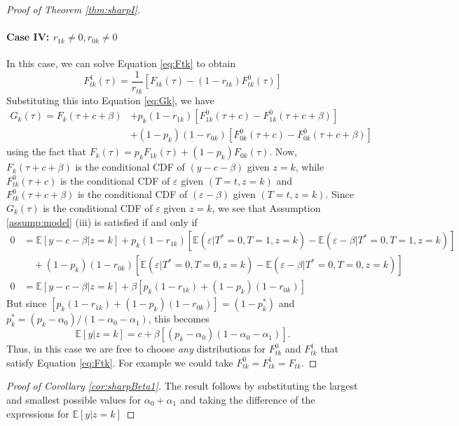 \begin{proof}[Proof of Theorem \ref{thm:sharpI}]
\paragraph{Case IV: $r_{1k}\neq 0, r_{0k} \neq 0$}
In this case, we can solve Equation \ref{eq:Ftk} to obtain
\[
  F^1_{tk}(\tau) = \frac{1}{r_{tk}}\left[F_{tk}(\tau) - (1 - r_{tk})F^0_{tk}(\tau)\right]
\]
Substituting this into Equation \ref{eq:Gk}, we have
\begin{align*}
  G_k(\tau) = F_k(\tau + c + \beta) &+ p_k(1 - r_{1k})\left[F^0_{1k}(\tau + c) - F_{1k}^0(\tau + c + \beta)\right]\\
  &+ (1 - p_k)(1 - r_{0k}) \left[ F^0_{0k}(\tau + c) - F^0_{0k}(\tau + c + \beta) \right]
\end{align*}
using the fact that $F_k(\tau) = p_k F_{1k}(\tau) + (1 - p_k) F_{0k}(\tau)$.
Now, $F_k(\tau + c + \beta)$ is the conditional CDF of $(y - c - \beta)$ given $z=k$, while $F_{tk}^0(\tau + c)$ is the conditional CDF of $\varepsilon$ given $(T = t,z =k)$ and $F^0_{tk}(\tau + c + \beta)$ is the conditional CDF of $(\varepsilon - \beta)$ given $(T = t, z=k)$.
Since $G_k(\tau)$ is the conditional CDF of $\varepsilon$ given $z=k$, we see that Assumption \ref{assump:model} (iii) is satisfied if and only if
\begin{align*}
  0 &= \mathbb{E}[y - c - \beta|z=k] + p_k(1 - r_{1k})\left[ \mathbb{E}(\varepsilon|T^*=0,T=1,z=k) - \mathbb{E}(\varepsilon - \beta|T^*=0,T=1,z=k) \right] \\
   &\quad + (1 - p_k)(1 - r_{0k})\left[ \mathbb{E}(\varepsilon|T^*=0,T=0,z=k) - \mathbb{E}(\varepsilon - \beta|T^*=0,T=0,z=k) \right]\\
   0 &= \mathbb{E}[y - c - \beta|z=k] + \beta\left[p_k(1 - r_{1k}) + (1 - p_k)(1 - r_{0k})\right]
\end{align*}
But since $\left[p_k(1 - r_{1k}) + (1 - p_k)(1 - r_{0k})\right] = (1 - p_k^*)$ and $p_k^* = (p_k - \alpha_0) /(1 - \alpha_0 - \alpha_1)$, this becomes 
\[
\mathbb{E}[y|z=k] = c + \beta\left[ (p_k - \alpha_0)(1 - \alpha_0 - \alpha_1) \right].
\]
Thus, in this case we are free to choose \emph{any} distributions for $F^{0}_{tk}$ and $F^1_{tk}$ that satisfy Equation \ref{eq:Ftk}.
For example we could take $F^0_{tk} = F^1_{tk} = F_{tk}$.
\end{proof}

\begin{proof}[Proof of Corollary \ref{cor:sharpBeta1}]
The result follows by substituting the largest and smallest possible values for $\alpha_0 + \alpha_1$ and taking the difference of the expressions for $\mathbb{E}[y|z=k]$
\end{proof}


